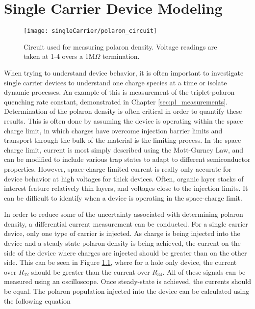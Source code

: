 \documentclass[../thesis.tex]{subfiles}
\begin{document}
\chapter{Single Carrier Device Modeling}\label{sec:polaron_density_measurement}


\begin{figure}[ht]
\centering
\texttt{[image: singleCarrier/polaron\_circuit]}
\caption{Circuit used for measuring polaron density.  Voltage readings are taken at 1-4 overs a 1M$\Omega$ termination.}
\label{fig:polaron_circuit}
\end{figure}

When trying to understand device behavior, it is often important to investigate single carrier devices to understand one charge species at a time or isolate dynamic processes.
An example of this is measurement of the triplet-polaron quenching rate constant, demonstrated in Chapter \ref{sec:pl_measurements}.
Determination of the polaron density is often critical in order to quantify these results.
This is often done by assuming the device is operating within the space charge limit, in which charges have overcome injection barrier limits and transport through the bulk of the material is the limiting process.\supercite{Reineke2007,Erickson2014}
In the space-charge limit, current is most simply described using the Mott-Gurney Law, and can be modified to include various trap states to adapt to different semiconductor properties.\supercite{Pope1999}
However, space-charge limited current is really only accurate for device behavior at high voltages for thick devices.  
Often, organic layer stacks of interest feature relatively thin layers, and voltages close to the injection limits.
It can be difficult to identify when a device is operating in the space-charge limit.

In order to reduce some of the uncertainty associated with determining polaron density, a differential current measurement can be conducted.  
For a single carrier device, only one type of carrier is injected.  
As charge is being injected into the device and a steady-state polaron density is being achieved, the current on the side of the device where charges are injected should be greater than on the other side.
This can be seen in Figure \ref{fig:polaron_circuit}, where for a hole only device, the current over $R_{12}$ should be greater than the current over $R_{34}$.
All of these signals can be measured using an oscilloscope.
Once steady-state is achieved, the currents should be equal.
The polaron population injected into the device can be calculated using the following equation
\end{document}
